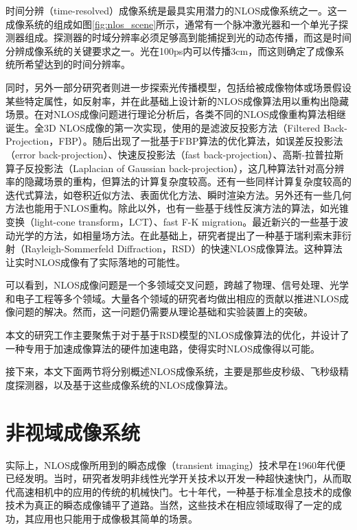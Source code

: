 \documentclass[master]{shtthesis}             %
\begin{document}
时间分辨（time-resolved）成像系统是最具实用潜力的NLOS成像系统之一。这一成像系统的组成如图\ref{fig:nlos_scene}所示，通常有一个脉冲激光器和一个单光子探测器组成。探测器的时域分辨率必须足够高到能捕捉到光的动态传播，而这是时间分辨成像系统的关键要求之一\citep{faccio2018trillion}。光在100ps内可以传播3cm，而这则确定了成像系统所希望达到的时间分辨率。

同时，另外一部分研究者则进一步探索光传播模型，包括给被成像物体或场景假设某些特定属性，如反射率，并在此基础上设计新的NLOS成像算法用以重构出隐藏场景。在对NLOS成像问题进行理论分析后\citep{ramesh20085d}，各类不同的NLOS成像重构算法相继诞生。全3D NLOS成像的第一次实现，使用的是滤波反投影方法（Filtered Back-Projection，FBP）\citep{Velten2012}。随后出现了一批基于FBP算法的优化算法，如误差反投影法（error back-projection）\citep{LaManna2019}、快速反投影法（fast back-projection）\citep{Arellano2017}、高斯-拉普拉斯算子反投影法（Laplacian of Gaussian back-projection）\citep{Laurenzis2014}，这几种算法针对高分辨率的隐藏场景的重构，但算法的计算复杂度较高。还有一些同样计算复杂度较高的迭代式算法，如卷积近似方法\citep{Ahn2019}、表面优化方法\citep{Tsai2019}、瞬时渲染方法\citep{Iseringhausen2018}。另外还有一些几何方法也能用于NLOS重构\citep{Tsai2017,Xin2019}。除此以外，也有一些基于线性反演方法的算法，如光锥变换（light-cone transform，LCT）\citep{Otoole2018}、fast F-K migration\citep{DavidB.Lindell2019}。最近新兴的一些基于波动光学的方法，如相量场方法\citep{Liu2019,Teichman2019,Dove2019,Liu2020}。在此基础上，研究者提出了一种基于瑞利索末菲衍射（Rayleigh-Sommerfeld Diffraction，RSD）的快速NLOS成像算法\citep{Liu}。这种算法让实时NLOS成像有了实际落地的可能性。

可以看到，NLOS成像问题是一个多领域交叉问题，跨越了物理、信号处理、光学和电子工程等多个领域。大量各个领域的研究者均做出相应的贡献以推进NLOS成像问题的解决。然而，这一问题仍需要从理论基础和实验装置上的突破。

本文的研究工作主要聚焦于对于基于RSD模型的NLOS成像算法的优化，并设计了一种专用于加速成像算法的硬件加速电路，使得实时NLOS成像得以可能。

接下来，本文下面两节将分别概述NLOS成像系统，主要是那些皮秒级、飞秒级精度探测器，以及基于这些成像系统的NLOS成像算法。

\section{非视域成像系统}\label{sec:img_sys}

实际上，NLOS成像所用到的瞬态成像（transient imaging）技术早在1960年代便已经发明。当时，研究者发明非线性光学开关技术以开发一种超快速快门，从而取代高速相机中的应用的传统的机械快门。七十年代，一种基于标准全息技术的成像技术为真正的瞬态成像铺平了道路\citep{faccio2018trillion,hariharan2002basics}。当然，这些技术在相应领域取得了一定的成功，其应用也只能用于成像极其简单的场景。
\end{document}
